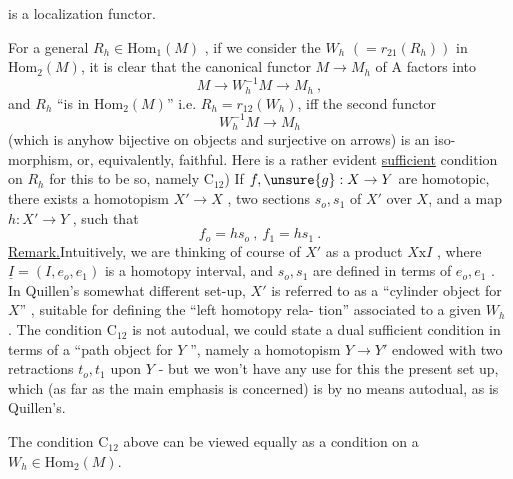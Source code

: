 
 is a localization functor.

For a general $R_h \in \mathrm{Hom}_1(M)$ , if we consider the  $W_h$
$( = r_{21}(R_h))$ in $\mathrm{Hom}_2(M)$, it is clear that the canonical functor $M \to M_h$
of A factors into
\[ M \to W_h^{-1}M \to M_h \ , \]
and $R_h$ ``is in $\mathrm{Hom}_2(M)$'' i.e. $R_h = r_{12}(W_h)$, iff the second functor
\[ W_h^{-1}M \to M_h \]
(which is anyhow bijective on objects and surjective on arrows) is an iso-%
morphism, or, equivalently, faithful. Here is a rather evident 
\uline{sufficient} condition on $R_h$ for this to be so,\hand{$^*$} namely\hand{:}
 C$_{12}$) If $f,\unsure{g} : X \to Y$ are homotopic, there exists a homotopism
$X' \to X$ ,  two sections $s_o,s_1$ of $X'$ over $X$, and a map $h \colon X' \to Y$ ,
such that
\[ f_o = hs_o \ , \ f_1 = hs_1 \ . \]
\uline{Remark.}Intuitively, we are thinking of course of $X'$ as a product $X\mathrm{x}I$ , where
$\underline{I} = (I,e_o,e_1)$ is a  homotopy interval, and $s_o,s_1$ are defined in terms of
$e_o,e_1$ . In Quillen's somewhat different set-up, $X'$ is referred to as a
``cylinder object for $X$'' , suitable for defining the ``left homotopy rela-%
tion'' associated to a given $W_h$ . The condition C$_{12}$ is not autodual,
we could state a dual sufficient condition in terms of a ``path object for
$Y$ '', namely a homotopism $Y \to Y'$ endowed with two retractions $t_o,t_1$ upon
$Y$ - but we won't have any use for this  the present set up, which
(as far as the main emphasis is concerned) is by no means autodual, as
is Quillen's.

\margin{\unsure{$\cdot$}} The condition C$_{12}$ above can be viewed equally as a condition on
a $W_h \in \mathrm{Hom}_2(M)$.

